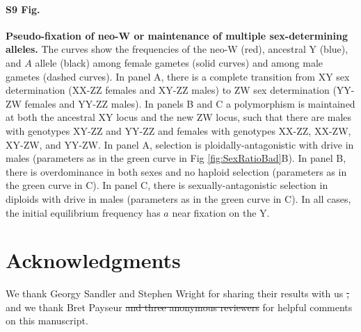 \documentclass[10pt,letterpaper]{article}
\providecommand{\DIFadd}[1]{{\protect\color{blue}\uwave{#1}}} %
\providecommand{\DIFdel}[1]{{\protect\color{red}\sout{#1}}}                      %
\providecommand{\DIFaddbegin}{} %
\providecommand{\DIFaddend}{} %
\providecommand{\DIFdelbegin}{} %
\providecommand{\DIFdelend}{} %
\begin{document}
\paragraph*{S9 Fig.}
\label{fig:freqAll}
{\bf Pseudo-fixation of neo-W or maintenance of multiple sex-determining alleles. }
The curves show the frequencies of the neo-W (red), ancestral Y (blue), and $A$ allele (black) among female gametes (solid curves) and among male gametes (dashed curves). 
In panel A, there is a complete transition from XY sex determination (XX-ZZ females and XY-ZZ males) to ZW sex determination (YY-ZW females and YY-ZZ males).  
In panels B and C a polymorphism is maintained at both the ancestral XY locus and the new ZW locus, such that there are males with genotypes XY-ZZ and YY-ZZ and females with genotypes XX-ZZ, XX-ZW, XY-ZW, and YY-ZW. 
In panel A, selection is ploidally-antagonistic with drive in males (parameters as in the green curve in Fig \ref{fig:SexRatioBad}B).
In panel B, there is overdominance in both sexes and no haploid selection (parameters as in the green curve in C).
In panel C, there is sexually-antagonistic selection in diploids with drive in males (parameters as in the green curve in C).
In all cases, the initial equilibrium frequency has $a$ near fixation on the Y.

\section*{Acknowledgments}
We thank Georgy Sandler and Stephen Wright for sharing their results with us \DIFdelbegin \DIFdel{, }\DIFdelend and we thank Bret Payseur \DIFdelbegin \DIFdel{and three anonymous reviewers }\DIFdelend for helpful comments on \DIFaddbegin \DIFadd{a previous version of }\DIFaddend this manuscript. 

\nolinenumbers

%
%
\DIFdelbegin %
\DIFdelend 
\end{document}

